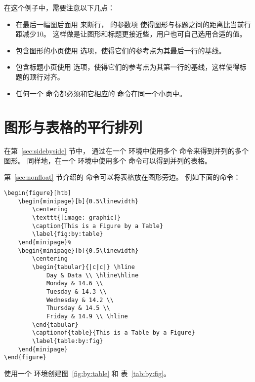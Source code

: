 在这个例子中，需要注意以下几点：
\begin{itemize}
	\item 在最后一幅图后面用 \cmd{\cmd{}} 来断行，
	\cmd{\cmd{}}的参数项 \opt{[-10pt]} 使得图形与标题之间的距离比当前行距减少10\pt 。
	这样做是让图形和标题更接近些，用户也可自己选用合适的值。
	\item 包含图形的小页使用 \opt{[b]} 选项，使得它们的参考点为其最后一行的基线。
	\item 包含标题小页使用 \opt{[t]} 选项，使得它们的参考点为其第一行的基线，这样使得标题的顶行对齐。
	\item 任何一个  命令都必须和它相应的  命令在同一个小页中。
\end{itemize}


\section{图形与表格的平行排列}\label{sec:figuretable}

在第~\ref{sec:sidebyside} 节中，
通过在一个  环境中使用多个  命令来得到并列的多个图形。
同样地，在一个  环境中使用多个  命令可以得到并列的表格。

第~\ref{sec:nonfloat} 节介绍的  命令可以将表格放在图形旁边。
例如下面的命令：
\begin{lstlisting}
\begin{figure}[htb]
	\begin{minipage}[b]{0.5\linewidth}
		\centering
		\texttt{[image: graphic]}
		\caption{This is a Figure by a Table}
		\label{fig:by:table}
	\end{minipage}%
	\begin{minipage}[b]{0.5\linewidth}
		\centering
		\begin{tabular}{|c|c|} \hline
			Day & Data \\ \hline\hline
			Monday & 14.6 \\
			Tuesday & 14.3 \\
			Wednesday & 14.2 \\
			Thursday & 14.5 \\
			Friday & 14.9 \\ \hline
		\end{tabular}
		\captionof{table}{This is a Table by a Figure}
		\label{table:by:fig}
	\end{minipage}
\end{figure}
\end{lstlisting}
使用一个  环境创建图~\ref{fig:by:table} 和 表~\ref{tab:by:fig}。

